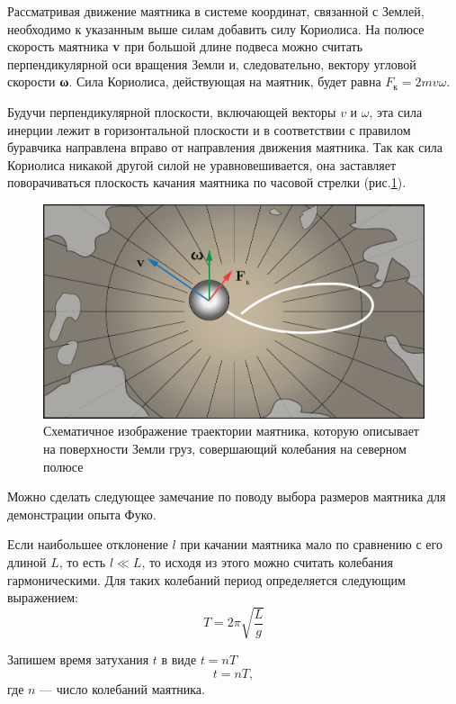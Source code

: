\documentclass[14pt,a4paper,oneside]{extarticle}	%
\begin{document}
	Рассматривая движение маятника в системе координат, связанной с Землей, необходимо к указанным выше силам добавить силу Кориолиса.
	На полюсе скорость маятника \textbf{v} при большой длине подвеса можно считать перпендикулярной оси вращения Земли и, следовательно, вектору угловой скорости \textbf{ω}.
	Сила Кориолиса, действующая на маятник, будет равна 
	$ F_{\text{к}} = 2mv\omega $.
	
	Будучи перпендикулярной плоскости, включающей векторы $ v $  и $ \omega $, эта сила инерции лежит в горизонтальной плоскости и в соответствии с правилом буравчика направлена вправо от направления движения маятника. 
	Так как сила Кориолиса никакой другой силой не уравновешивается, она заставляет поворачиваться плоскость качания маятника по часовой стрелки (рис.\ref{fuko-5}).

	\begin{figure}[H] 	
		\centering 	
		\includegraphics[width=0.75\linewidth]{fuko-5.png}
		\caption{Схематичное изображение траектории маятника, которую описывает на поверхности Земли груз, совершающий колебания на северном полюсе}
		\label{fuko-5}
	\end{figure}
	
	Можно сделать следующее замечание по поводу выбора размеров маятника для демонстрации опыта Фуко. 
	
	Если наибольшее отклонение $ l $ при качании маятника мало по сравнению с его длиной $ L $, то есть $ l \ll L $, то исходя из этого можно считать колебания гармоническими.
	Для таких колебаний период определяется следующим выражением:
	\begin{equation}\label{fuko-1eq1}
	T = 2\pi \sqrt{\frac{L}{g}}
	\end{equation}
	
	Запишем время затухания $ t $ в виде $ t = nT $
	\begin{equation}\label{fuko-1eq2}
	t = nT,
	\end{equation}
	где $ n $ — число колебаний маятника.
	
\end{document}
